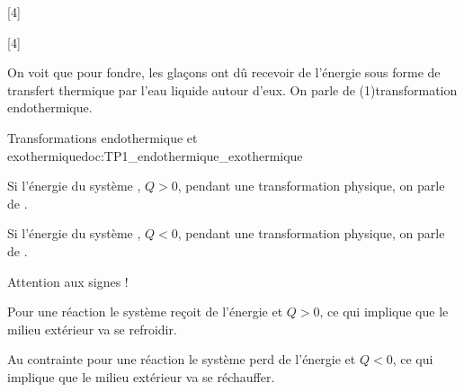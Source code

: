 [4]

[4]


\pasCorrection{\newpage}

On voit que pour fondre, les glaçons ont dû recevoir de l'énergie sous forme de transfert thermique par l'eau liquide autour d'eux.
On parle de \texteTrou(1){transformation endothermique.}

\begin{doc}{Transformations endothermique et exothermique}{doc:TP1_endothermique_exothermique}
  \begin{importants}
    \begin{listePoints}
      \item Si l'énergie du système , $Q > 0$, pendant une transformation physique, on parle de .
      \item Si l'énergie du système , $Q < 0$, pendant une transformation physique, on parle de .
    \end{listePoints}
  \end{importants}
  \begin{center}
  \end{center}
  \attention Attention aux signes !
  
  \begin{listePoints}
    \item Pour une réaction  le système reçoit de l'énergie et $Q > 0$, ce qui implique que le milieu extérieur va se refroidir. 
    \item Au contrainte pour une réaction  le système perd de l'énergie et $Q < 0$, ce qui implique que le milieu extérieur va se réchauffer.
  \end{listePoints}
\end{doc}
